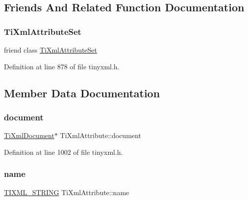 \subsection{Friends And Related Function Documentation}
\hypertarget{class_ti_xml_attribute_a35a7b7f89f708527677d5078d41ce0bf}{}\label{class_ti_xml_attribute_a35a7b7f89f708527677d5078d41ce0bf} 
\subsubsection{\texorpdfstring{Ti\+Xml\+Attribute\+Set}{TiXmlAttributeSet}}
{\footnotesize\ttfamily friend class \hyperlink{class_ti_xml_attribute_set}{Ti\+Xml\+Attribute\+Set}\hspace{0.3cm}{\ttfamily [friend]}}



Definition at line 878 of file tinyxml.\+h.



\subsection{Member Data Documentation}
\hypertarget{class_ti_xml_attribute_ada41d3cff50cd33a78072806f88d4433}{}\label{class_ti_xml_attribute_ada41d3cff50cd33a78072806f88d4433} 
\subsubsection{\texorpdfstring{document}{document}}
{\footnotesize\ttfamily \hyperlink{class_ti_xml_document}{Ti\+Xml\+Document}$\ast$ Ti\+Xml\+Attribute\+::document\hspace{0.3cm}{\ttfamily [private]}}



Definition at line 1002 of file tinyxml.\+h.

\hypertarget{class_ti_xml_attribute_afcbe165f33f08cf9b24daa33f0ee951a}{}\label{class_ti_xml_attribute_afcbe165f33f08cf9b24daa33f0ee951a} 
\subsubsection{\texorpdfstring{name}{name}}
{\footnotesize\ttfamily \hyperlink{tinyxml_8h_a92bada05fd84d9a0c9a5bbe53de26887}{T\+I\+X\+M\+L\+\_\+\+S\+T\+R\+I\+NG} Ti\+Xml\+Attribute\+::name\hspace{0.3cm}{\ttfamily [private]}}



